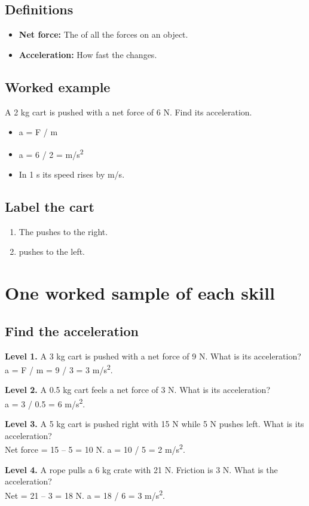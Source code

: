 \documentclass[11pt]{article}
\begin{document}
\subsection*{Definitions}\begin{itemize}
\item \textbf{Net force:} The  of all the forces on an object.
\item \textbf{Acceleration:} How fast the  changes.
\end{itemize}
\subsection*{Worked example}
A 2 kg cart is pushed with a net force of 6 N. Find its acceleration.\\
\begin{itemize}
\item a = F / m
\item a = 6 / 2 =  m/s\textsuperscript{2}
\item In 1 s its speed rises by  m/s.
\end{itemize}
\subsection*{Label the cart}
\begin{enumerate}
\item The  pushes to the right.
\item {} pushes to the left.
\end{enumerate}
\section*{One worked sample of each skill}
\subsection*{Find the acceleration}
\noindent\textbf{Level 1.} A 3 kg cart is pushed with a net force of 9 N. What is its acceleration?\\  \quad a = F / m = 9 / 3 = 3 m/s\textsuperscript{2}.\par\medskip
\noindent\textbf{Level 2.} A 0.5 kg cart feels a net force of 3 N. What is its acceleration?\\  \quad a = 3 / 0.5 = 6 m/s\textsuperscript{2}.\par\medskip
\noindent\textbf{Level 3.} A 5 kg cart is pushed right with 15 N while 5 N pushes left. What is its acceleration?\\  \quad Net force = 15 -- 5 = 10 N. a = 10 / 5 = 2 m/s\textsuperscript{2}.\par\medskip
\noindent\textbf{Level 4.} A rope pulls a 6 kg crate with 21 N. Friction is 3 N. What is the acceleration?\\  \quad Net = 21 -- 3 = 18 N. a = 18 / 6 = 3 m/s\textsuperscript{2}.\par\medskip
\end{document}
